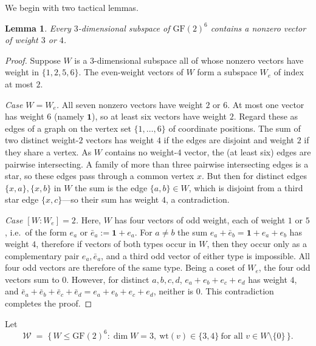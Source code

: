 \documentclass[12pt]{article}
\newtheorem{lem}[thm]{Lemma}
\theoremstyle{definition}
\numberwithin{equation}{section}
\newcommand{\W}{\mathcal{W}}
\newcommand{\GF}[1]{\mathrm{GF}(#1)}
\newcommand{\wt}{\mathrm{wt}}
\newcommand{\onevec}{\mathbf{1}}
\begin{document}

We begin with two tactical lemmas.

\begin{lem}\label{lem:block34}
Every $3$-dimensional subspace of $\GF2^6$ contains a nonzero vector of weight $3$ or $4$.
\end{lem}

\begin{proof}
Suppose $W$ is a $3$-dimensional subspace all of whose nonzero vectors have weight in $\{1,2,5,6\}$.  The even-weight vectors of $W$ form a subspace $W_e$ of index at most $2$.

\smallskip
\noindent\textit{Case $W=W_e$.}  All seven nonzero vectors have weight $2$ or $6$.  At most one vector has weight $6$ (namely $\onevec$), so at least six vectors have weight $2$. Regard these as edges of a graph on the vertex set $\{1,\ldots,6\}$ of coordinate positions.  The sum of two distinct weight-$2$ vectors has weight $4$ if the edges are disjoint and weight $2$ if they share a vertex. As $W$ contains no weight-$4$ vector,
the (at least six) edges are pairwise intersecting.  A family of more than three pairwise intersecting edges is a star, so these edges pass through a common vertex $x$. But then for distinct edges $\{x,a\},\{x,b\}$ in $W$ the sum is the edge $\{a,b\}\in W$, which is disjoint from a third star edge $\{x,c\}$---so their sum has weight $4$, a contradiction.

\smallskip
\noindent\textit{Case $[W:W_e]=2$.}  Here, $W$ has four vectors of odd weight, each of weight $1$ or $5$, i.e.\ of the form $e_a$ or $\bar e_a:=\onevec+e_a$.  For $a\ne b$ the sum $e_a+\bar e_b= \onevec+e_a+e_b$ has weight $4$, therefore if vectors of both types occur in $W$, then they occur only as a complementary pair $e_a,\bar e_a$, and a third odd vector of either type is impossible.  All four odd vectors are therefore of the same type.  Being a coset of $W_e$, the four odd vectors sum to $0$. However, for distinct $a,b,c,d$, $e_a+e_b+e_c+e_d$ has weight $4$, and $\bar e_a+\bar e_b+\bar e_c+\bar e_d=e_a+e_b+e_c+e_d$, neither is $0$.  This contradiction completes the proof.
\end{proof}

Let
\[
  \W \;=\; \bigl\{\,W\le\GF2^6 : \dim W=3,\ \wt(v)\in\{3,4\}\ \text{for all } v\in W\setminus\{0\}\,\bigr\}.
\]
\end{document}
